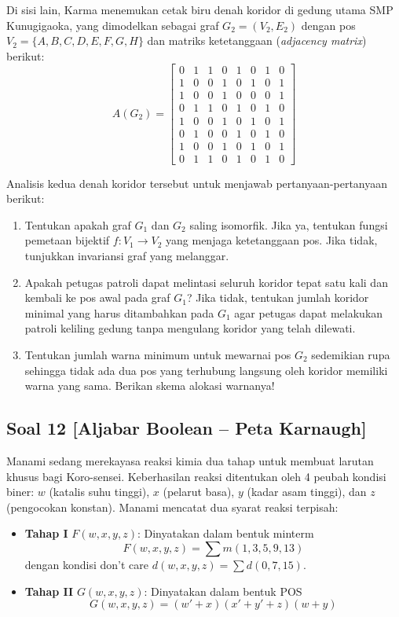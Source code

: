 \documentclass[12pt,a4paper]{article}
\begin{document}
Di sisi lain, Karma menemukan cetak biru denah koridor di gedung utama SMP Kunugigaoka, yang dimodelkan sebagai graf $G_2 = (V_2, E_2)$ dengan pos $V_2 = \{A, B, C, D, E, F, G, H\}$ dan matriks ketetanggaan (\textit{adjacency matrix}) berikut:
\[
A(G_2) = \begin{bmatrix}
0 & 1 & 1 & 0 & 1 & 0 & 1 & 0 \\
1 & 0 & 0 & 1 & 0 & 1 & 0 & 1 \\
1 & 0 & 0 & 1 & 0 & 0 & 0 & 1 \\
0 & 1 & 1 & 0 & 1 & 0 & 1 & 0 \\
1 & 0 & 0 & 1 & 0 & 1 & 0 & 1 \\
0 & 1 & 0 & 0 & 1 & 0 & 1 & 0 \\
1 & 0 & 0 & 1 & 0 & 1 & 0 & 1 \\
0 & 1 & 1 & 0 & 1 & 0 & 1 & 0
\end{bmatrix}
\]

Analisis kedua denah koridor tersebut untuk menjawab pertanyaan-pertanyaan berikut:
\begin{enumerate}[label=(\alph*)]
    \item Tentukan apakah graf $G_1$ dan $G_2$ saling isomorfik. Jika ya, tentukan fungsi pemetaan bijektif $f: V_1 \to V_2$ yang menjaga ketetanggaan pos. Jika tidak, tunjukkan invariansi graf yang melanggar.
    \item Apakah petugas patroli dapat melintasi seluruh koridor tepat satu kali dan kembali ke pos awal pada graf $G_1$? Jika tidak, tentukan jumlah koridor minimal yang harus ditambahkan pada $G_1$ agar petugas dapat melakukan patroli keliling gedung tanpa mengulang koridor yang telah dilewati.
    \item Tentukan jumlah warna minimum untuk mewarnai pos $G_2$ sedemikian rupa sehingga tidak ada dua pos yang terhubung langsung oleh koridor memiliki warna yang sama. Berikan skema alokasi warnanya!
\end{enumerate}

\subsection*{Soal 12 [Aljabar Boolean -- Peta Karnaugh]}
Manami sedang merekayasa reaksi kimia dua tahap untuk membuat larutan khusus bagi Koro-sensei. Keberhasilan reaksi ditentukan oleh 4 peubah kondisi biner: $w$ (katalis suhu tinggi), $x$ (pelarut basa), $y$ (kadar asam tinggi), dan $z$ (pengocokan konstan). Manami mencatat dua syarat reaksi terpisah:

\begin{itemize}
    \item \textbf{Tahap I} $F(w,x,y,z)$: Dinyatakan dalam bentuk minterm
    \[ F(w,x,y,z) = \sum m(1, 3, 5, 9, 13) \]
    dengan kondisi don't care $d(w,x,y,z) = \sum d(0, 7, 15)$.
    \item \textbf{Tahap II} $G(w,x,y,z)$: Dinyatakan dalam bentuk POS
    \[ G(w,x,y,z) = (w' + x)(x' + y' + z)(w + y) \]
\end{itemize}
\end{document}
